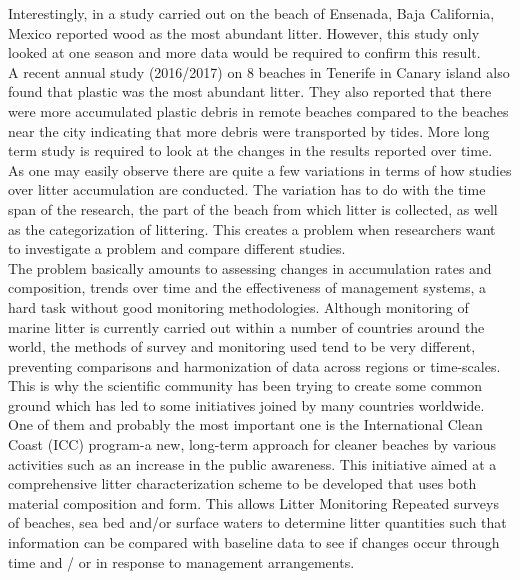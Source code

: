 \documentclass[10pt]{article}\usepackage[]{graphicx}\usepackage[]{color}
\begin{document}
Interestingly, in a study carried out on the beach of Ensenada, Baja California, Mexico reported wood as the most abundant litter. \cite{SILVA2003} However, this study only looked at one season and more data would be required to confirm this result. \\

A recent annual study (2016/2017) on 8 beaches in Tenerife in Canary island also found that plastic was the most abundant litter. They also reported that there were more accumulated plastic debris in remote beaches compared to the beaches near the city indicating that more debris were transported by tides. More long term study is required to look at the changes in the results reported over time. \cite{REINOLD2020} \\

As one may easily observe there are quite a few variations in terms of how studies over litter accumulation are conducted. The variation has to do with the time span of the research, the part of the beach from which litter is collected, as well as the categorization of littering. This creates a problem when researchers want to investigate a problem and compare different studies. \\
The problem basically amounts to assessing changes in accumulation rates and composition, trends over time and the effectiveness of management systems, a hard task without good monitoring methodologies. Although monitoring of marine litter is currently carried out within a number of countries around the world, the methods of survey and monitoring used tend to be very different, preventing comparisons and harmonization of data across regions or time-scales.\\

This is why the scientific community has been trying to create some common ground which has led to some initiatives joined by many countries worldwide. One of them and probably the most important one is the International Clean Coast (ICC) program-a new, long-term approach for cleaner beaches by various activities such as an increase in the public awareness. \cite{ CHESHIRE2009} This initiative aimed at a comprehensive litter characterization scheme to be developed that uses both material composition and form. This allows Litter Monitoring Repeated surveys of beaches, sea bed and/or surface waters to determine litter quantities such that information can be compared with baseline data to see if changes occur through time and / or in response to management arrangements.
\end{document}

